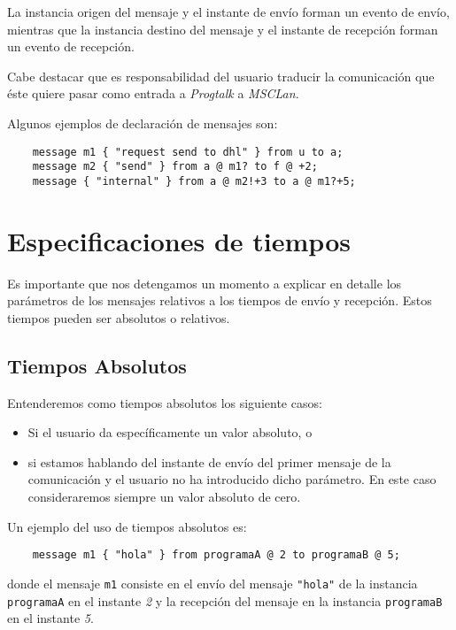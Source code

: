 La instancia origen del mensaje y el instante de envío forman un
evento de envío, mientras que la instancia destino del mensaje y el
instante de recepción forman un evento de recepción.

Cabe destacar que es responsabilidad del usuario traducir la
comunicación que éste quiere pasar como entrada a \textit{Progtalk} a
\textit{MSCLan}.

Algunos ejemplos de declaración de mensajes son:

\begin{lstlisting}
    message m1 { "request send to dhl" } from u to a;
    message m2 { "send" } from a @ m1? to f @ +2;
    message { "internal" } from a @ m2!+3 to a @ m1?+5;
\end{lstlisting}

\section{Especificaciones de tiempos}
\label{sec:Tiempos}

Es importante que nos detengamos un momento a explicar en detalle los
parámetros de los mensajes relativos a los tiempos de envío y
recepción. Estos tiempos pueden ser absolutos o relativos.

\subsection{Tiempos Absolutos}

Entenderemos como tiempos absolutos los siguiente casos:

\begin{itemize}
\item Si el usuario da específicamente un valor absoluto, o
\item si estamos hablando del instante de envío del primer mensaje de
  la comunicación y el usuario no ha introducido dicho parámetro. En
  este caso consideraremos siempre un valor absoluto de cero.
\end{itemize}

Un ejemplo del uso de tiempos absolutos es:

\begin{lstlisting}
    message m1 { "hola" } from programaA @ 2 to programaB @ 5;
\end{lstlisting}

\noindent donde el mensaje \lstinline{m1} consiste en el envío del mensaje
\lstinline{"hola"} de la instancia \lstinline{programaA} en el
instante \textit{2} y la recepción del mensaje en la instancia
\lstinline{programaB} en el instante \textit{5}.

